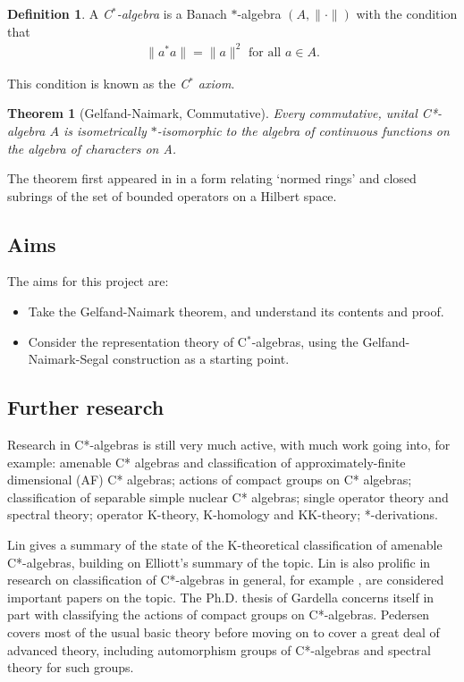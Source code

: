 \documentclass[12pt,a4paper]{amsart}
\theoremstyle{plain}
\newtheorem*{thm*}{Theorem}
\theoremstyle{definition}
\newtheorem{defn}{Definition}
\begin{document}
\begin{defn}
A \emph{C$^\ast$-algebra} is a Banach $\ast$-algebra $(A, \| \cdot \|)$ with the condition that
\begin{align*}
	\|a ^\ast a\| = \|a\|^2 \mbox{ for all } a \in A.
\end{align*}
\end{defn}
 
This condition is known as the \emph{C$^\ast$ axiom}. 


\begin{thm*}[Gelfand-Naimark, Commutative]
	Every commutative, unital C*-algebra $A$ is isometrically $\ast$-isomorphic to the algebra of continuous functions on the algebra of characters on A.

\end{thm*}
The theorem first appeared in \cite{gelfand43} in a form relating `normed rings' and closed subrings of the set of bounded operators on a Hilbert space.


\subsection{Aims}
The aims for this project are:
\begin{itemize}
	\item Take the Gelfand-Naimark theorem, and understand its contents and proof.
	\item Consider the representation theory of C$^\ast$-algebras, using the Gelfand-Naimark-Segal construction as a starting point.
\end{itemize}

\subsection{Further research}
	Research in C*-algebras is still very much active, with much work going into, for example: amenable C* algebras and classification of approximately-finite dimensional (AF) C* algebras;  actions of compact groups on C* algebras; classification of separable simple nuclear C* algebras; single operator theory and spectral theory; operator K-theory, K-homology and KK-theory; *-derivations.
	
	
	Lin \cite{lin01} gives a summary of the state of the K-theoretical classification of amenable C*-algebras, building on Elliott's summary \cite{elliott94} of the topic. 
	Lin is also prolific in research on classification of C*-algebras in general, for example \cite{lin08}, \cite{lin11} are considered important papers on the topic.
	The Ph.D. thesis of Gardella \cite{gardella15} concerns itself in part with classifying the actions of compact groups on C*-algebras.
	Pedersen \cite{pedersen79} covers most of the usual basic theory before moving on to cover a great deal of advanced theory, including automorphism groups of C*-algebras and spectral theory for such groups.
	
\end{document}
